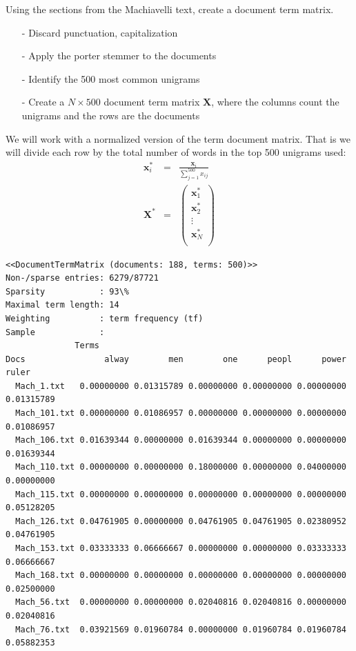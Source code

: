 \documentclass[12pt,letterpaper]{article}
\begin{document}
Using the sections from the Machiavelli text, create a document term matrix.
\begin{itemize}
\item[-] Discard punctuation, capitalization
\item[-] Apply the porter stemmer to the documents
\item[-] Identify the 500 most common unigrams
\item[-] Create a $N \times 500$ document term matrix $\boldsymbol{X}$, where the columns count the unigrams and the rows are the documents
\end{itemize}


We will work with a normalized version of the term document matrix.  That is we will divide each row by the total number of words in the top 500 unigrams used:
\begin{eqnarray}
\boldsymbol{x}_{i}^{*} & = & \frac{\boldsymbol{x}_{i}}{\sum_{j=1}^{500} x_{ij}} \nonumber\\
\boldsymbol{X}^{*} & = & \begin{pmatrix} \boldsymbol{x}_{1}^{*} \\
\boldsymbol{x}_{2}^{*} \\
\vdots \\
\boldsymbol{x}_{N}^{*} \\
  \end{pmatrix}  \nonumber
\end{eqnarray}

  

\begin{Verbatim}
<<DocumentTermMatrix (documents: 188, terms: 500)>>
Non-/sparse entries: 6279/87721
Sparsity           : 93\%
Maximal term length: 14
Weighting          : term frequency (tf)
Sample             :
              Terms
Docs                alway        men        one      peopl      power      ruler       
  Mach_1.txt   0.00000000 0.01315789 0.00000000 0.00000000 0.00000000 0.01315789 
  Mach_101.txt 0.00000000 0.01086957 0.00000000 0.00000000 0.00000000 0.01086957 
  Mach_106.txt 0.01639344 0.00000000 0.01639344 0.00000000 0.00000000 0.01639344 
  Mach_110.txt 0.00000000 0.00000000 0.18000000 0.00000000 0.04000000 0.00000000 
  Mach_115.txt 0.00000000 0.00000000 0.00000000 0.00000000 0.00000000 0.05128205
  Mach_126.txt 0.04761905 0.00000000 0.04761905 0.04761905 0.02380952 0.04761905 
  Mach_153.txt 0.03333333 0.06666667 0.00000000 0.00000000 0.03333333 0.06666667 
  Mach_168.txt 0.00000000 0.00000000 0.00000000 0.00000000 0.00000000 0.02500000 
  Mach_56.txt  0.00000000 0.00000000 0.02040816 0.02040816 0.00000000 0.02040816 
  Mach_76.txt  0.03921569 0.01960784 0.00000000 0.01960784 0.01960784 0.05882353 
\end{Verbatim}
  
\end{document}
